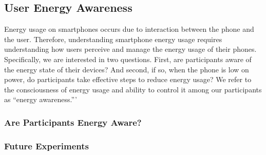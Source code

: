 \subsection{User Energy Awareness}
\label{subsec-awareness}

Energy usage on smartphones occurs due to interaction between the phone and
the user. Therefore, understanding smartphone energy usage requires
understanding how users perceive and manage the energy usage of their phones.
Specifically, we are interested in two questions. First, are \PhoneLab{}
participants aware of the energy state of their devices? And second, if so,
when the phone is low on power, do participants take effective steps to
reduce energy usage? We refer to the consciousness of energy usage and
ability to control it among our participants as ``energy awareness.'''

\subsubsection{Are Participants Energy Aware?}

\subsubsection{Future Experiments}

